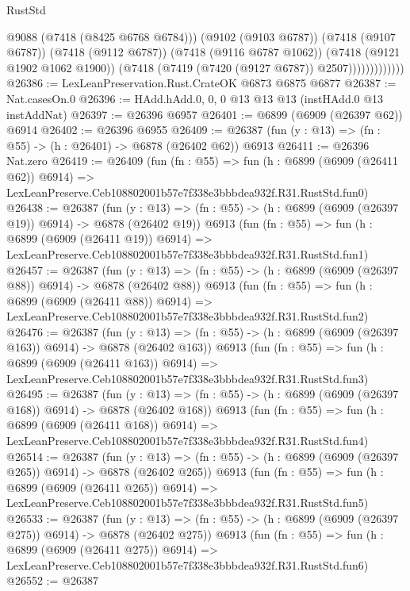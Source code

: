 \begin{lexlean}{RustStd}
\begin{coremodule}
                            @9088
                            (@7418 (@8425 @6768 @6784)))
                          (@9102 (@9103 @6787))
                          (@7418 (@9107 @6787))
                          (@7418 (@9112 @6787))
                          (@7418 (@9116 @6787 @1062))
                          (@7418 (@9121 @1902 @1062 @1900))
                          (@7418 (@7419 (@7420 (@9127 @6787)) @2507)))))))))))))
@26386 := LexLeanPreservation.Rust.CrateOK @6873 @6875 @6877
@26387 := Nat.casesOn.{0}
@26396 := HAdd.hAdd.{0, 0, 0} @13 @13 @13 (instHAdd.{0} @13 instAddNat)
@26397 := @26396 @6957
@26401 := @6899 (@6909 (@26397 @62)) @6914
@26402 := @26396 @6955
@26409 := @26387 (fun (y : @13) => (fn : @55) -> (h : @26401) -> @6878 (@26402 @62)) @6913
@26411 := @26396 Nat.zero
@26419 := @26409
    (fun (fn : @55) =>
    fun (h : @6899 (@6909 (@26411 @62)) @6914) =>
    LexLeanPreserve.Ceb108802001b57e7f338e3bbbdea932f.R31.RustStd.fun0)
@26438 := @26387
    (fun (y : @13) => (fn : @55) -> (h : @6899 (@6909 (@26397 @19)) @6914) -> @6878 (@26402 @19))
    @6913
    (fun (fn : @55) =>
    fun (h : @6899 (@6909 (@26411 @19)) @6914) =>
    LexLeanPreserve.Ceb108802001b57e7f338e3bbbdea932f.R31.RustStd.fun1)
@26457 := @26387
    (fun (y : @13) => (fn : @55) -> (h : @6899 (@6909 (@26397 @88)) @6914) -> @6878 (@26402 @88))
    @6913
    (fun (fn : @55) =>
    fun (h : @6899 (@6909 (@26411 @88)) @6914) =>
    LexLeanPreserve.Ceb108802001b57e7f338e3bbbdea932f.R31.RustStd.fun2)
@26476 := @26387
    (fun (y : @13) => (fn : @55) -> (h : @6899 (@6909 (@26397 @163)) @6914) -> @6878 (@26402 @163))
    @6913
    (fun (fn : @55) =>
    fun (h : @6899 (@6909 (@26411 @163)) @6914) =>
    LexLeanPreserve.Ceb108802001b57e7f338e3bbbdea932f.R31.RustStd.fun3)
@26495 := @26387
    (fun (y : @13) => (fn : @55) -> (h : @6899 (@6909 (@26397 @168)) @6914) -> @6878 (@26402 @168))
    @6913
    (fun (fn : @55) =>
    fun (h : @6899 (@6909 (@26411 @168)) @6914) =>
    LexLeanPreserve.Ceb108802001b57e7f338e3bbbdea932f.R31.RustStd.fun4)
@26514 := @26387
    (fun (y : @13) => (fn : @55) -> (h : @6899 (@6909 (@26397 @265)) @6914) -> @6878 (@26402 @265))
    @6913
    (fun (fn : @55) =>
    fun (h : @6899 (@6909 (@26411 @265)) @6914) =>
    LexLeanPreserve.Ceb108802001b57e7f338e3bbbdea932f.R31.RustStd.fun5)
@26533 := @26387
    (fun (y : @13) => (fn : @55) -> (h : @6899 (@6909 (@26397 @275)) @6914) -> @6878 (@26402 @275))
    @6913
    (fun (fn : @55) =>
    fun (h : @6899 (@6909 (@26411 @275)) @6914) =>
    LexLeanPreserve.Ceb108802001b57e7f338e3bbbdea932f.R31.RustStd.fun6)
@26552 := @26387

\end{coremodule}
\end{lexlean}
